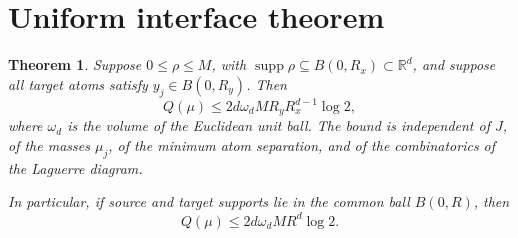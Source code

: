 \documentclass[11pt]{article}
\newtheorem{theorem}{Theorem}
\newcommand{\R}{\mathbb R}
\newcommand{\supp}{\operatorname{supp}}
\begin{document}
\section{Uniform interface theorem}

\begin{theorem}\label{thm:main}
Suppose $0\leq\rho\leq M$, with
$\supp\rho\subseteq B(0,R_x)\subset\R^d$, and suppose all target atoms
satisfy $y_j\in B(0,R_y)$.  Then
\[
 Q(\mu)\leq
 2d\omega_d M R_yR_x^{d-1}\log 2,
 \tag{4}
\]
where $\omega_d$ is the volume of the Euclidean unit ball.  The bound is
independent of $J$, of the masses $\mu_j$, of the minimum atom separation,
and of the combinatorics of the Laguerre diagram.

In particular, if source and target supports lie in the common ball
$B(0,R)$, then
\[
 Q(\mu)\leq 2d\omega_d M R^d\log 2.
 \tag{5}
\]
\end{theorem}
\end{document}
